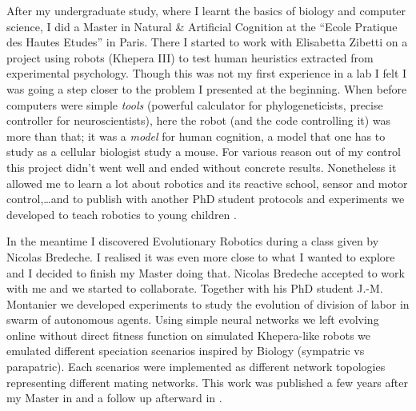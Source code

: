 \documentclass[10pt]{article}
\begin{document}
After my undergraduate study, where I learnt the basics of biology and computer science, I did a Master in Natural \& Artificial Cognition at the ``Ecole Pratique des Hautes Etudes'' in Paris.  There I started to work with Elisabetta Zibetti on a project using robots (Khepera III) to test human heuristics extracted from experimental psychology. Though this was not my first experience in a lab  %
I felt I was going a step closer to the problem I presented at the beginning. When before computers were simple \emph{tools} (powerful calculator for  phylogeneticists, precise controller for neuroscientists), here the robot (and the code controlling it) was more than that; it was a \emph{model} for human cognition, a model that one has to study as a cellular biologist study a mouse. For various reason out of my control this project didn't went well and ended without concrete results. Nonetheless it allowed me to learn a lot about robotics and its reactive school, sensor and motor control,\ldots and to publish with another PhD student protocols and experiments we developed to teach robotics to young children \cite{gaudiello2010representations}.

In the meantime I discovered Evolutionary Robotics during a class given by Nicolas Bredeche. I realised it was even more close to what I wanted to explore and I decided to finish my Master doing that. Nicolas Bredeche accepted to work with me and we started to collaborate. Together with his PhD student J.-M. Montanier we developed experiments to study the evolution of division of labor in swarm of autonomous agents. Using simple neural networks we left evolving online without direct fitness function on simulated Khepera-like robots we emulated different speciation scenarios inspired by Biology (sympatric vs parapatric). Each scenarios were implemented as different network topologies representing different mating networks. This work was published a few years after my Master in \cite{montanier2016behavioralspecializationinembodiedevolutionaryroboticswhysodifficult} and a follow up afterward in \cite{bredeche2017benefitsofproportionateselectioninembodiedevolutionacasestudywithbehaviouralspecialization}. %
\end{document}
